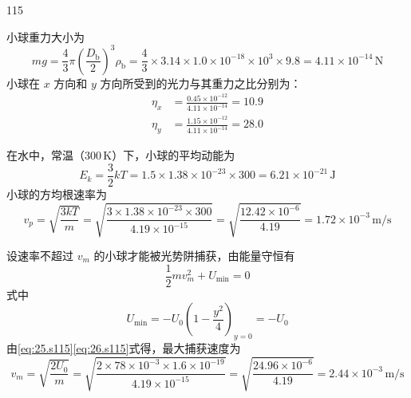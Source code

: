 \begin{solution}{115}
\begin{subsolution}
        小球重力大小为
        \begin{equation}
            mg = \frac{4}{3} \pi \left(\frac{D_{\mathrm{b}}}{2}\right)^{3} \rho_{\mathrm{b}} = \frac{4}{3} \times 3.14 \times 1.0 \times 10^{-18} \times 10^{3} \times 9.8 = 4.11 \times 10^{-14} \,\mathrm{N}
            \label{eq:20.s115}
        \end{equation}
        小球在 $x$ 方向和 $y$ 方向所受到的光力与其重力之比分别为：
        \begin{align}
            \eta_{x} &= \frac{0.45 \times 10^{-12}}{4.11 \times 10^{-14}} = 10.9 \label{eq:21.s115} \\
            \eta_{y} &= \frac{1.15 \times 10^{-12}}{4.11 \times 10^{-14}} = 28.0 \label{eq:22.s115}
        \end{align}
    \end{subsolution}
    \begin{subsolution}
        在水中，常温（$300 \,\mathrm{K}$）下，小球的平均动能为
        \begin{equation}
            E_{k} = \frac{3}{2} k T = 1.5 \times 1.38 \times 10^{-23} \times 300 = 6.21 \times 10^{-21} \,\mathrm{J}
            \label{eq:23.s115}
        \end{equation}
        小球的方均根速率为
        \begin{equation}
            v_{p} = \sqrt{\frac{3 k T}{m}} = \sqrt{\frac{3 \times 1.38 \times 10^{-23} \times 300}{4.19 \times 10^{-15}}} = \sqrt{\frac{12.42 \times 10^{-6}}{4.19}} = 1.72 \times 10^{-3} \,\mathrm{m/s}
            \label{eq:24.s115}
        \end{equation}
    \end{subsolution}
    \begin{subsolution}
        设速率不超过 $v_{m}$ 的小球才能被光势阱捕获，由能量守恒有
        \begin{equation}
            \frac{1}{2} m v_{m}^{2} + U_{\min} = 0
            \label{eq:25.s115}
        \end{equation}
        式中
        \begin{equation}
            U_{\min} = - U_{0} \left(1 - \frac{y^{2}}{4}\right)_{y=0} = - U_{0}
            \label{eq:26.s115}
        \end{equation}
        由\eqref{eq:25.s115}\eqref{eq:26.s115}式得，最大捕获速度为
        \begin{equation}
            v_{m} = \sqrt{\frac{2 U_{0}}{m}} = \sqrt{\frac{2 \times 78 \times 10^{-3} \times 1.6 \times 10^{-19}}{4.19 \times 10^{-15}}} = \sqrt{\frac{24.96 \times 10^{-6}}{4.19}} = 2.44 \times 10^{-3} \,\mathrm{m/s}

\end{equation}
\end{subsolution}
\end{solution}
